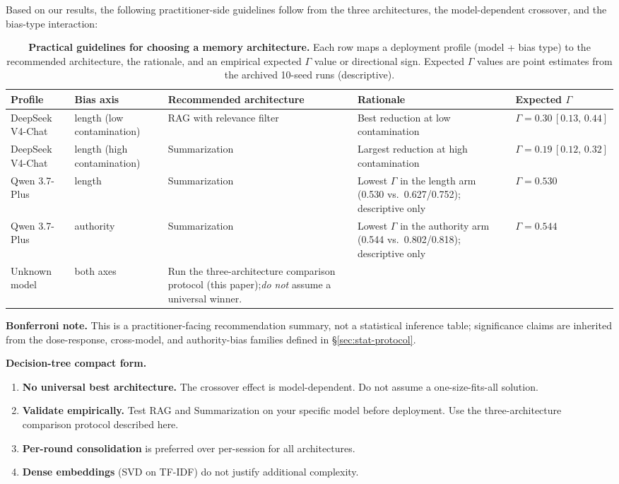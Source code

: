 \documentclass[11pt]{article}
\begin{document}
Based on our results, the following practitioner-side guidelines follow from the three architectures, the model-dependent crossover, and the bias-type interaction:

\begin{table}[t]
\centering
\caption{\textbf{Practical guidelines for choosing a memory architecture.} Each row maps a deployment profile (model + bias type) to the recommended architecture, the rationale, and an empirical expected $\Gamma$ value or directional sign. Expected $\Gamma$ values are point estimates from the archived 10-seed runs (descriptive).}
\label{tab:guidelines}
\small
\begin{tabular}{@{}p{2.4cm}p{2.2cm}p{3.1cm}p{3.3cm}p{2.4cm}@{}}
\toprule
\textbf{Profile} & \textbf{Bias axis} & \textbf{Recommended architecture} & \textbf{Rationale} & \textbf{Expected $\Gamma$} \\
\midrule
DeepSeek V4-Chat & length (low contamination)  & RAG with relevance filter & Best reduction at low contamination       & $\Gamma = 0.30\,[0.13,\,0.44]$ \\
DeepSeek V4-Chat & length (high contamination) & Summarization              & Largest reduction at high contamination   & $\Gamma = 0.19\,[0.12,\,0.32]$ \\
Qwen 3.7-Plus     & length                       & Summarization                & Lowest $\Gamma$ in the length arm (0.530 vs.\ 0.627/0.752); descriptive only & $\Gamma = 0.530$ \\
Qwen 3.7-Plus     & authority                    & Summarization                & Lowest $\Gamma$ in the authority arm (0.544 vs.\ 0.802/0.818); descriptive only & $\Gamma = 0.544$ \\
Unknown model     & both axes                    & Run the three-architecture comparison protocol (this paper);\emph{do not} assume a universal winner. & & \\
\bottomrule
\end{tabular}
\par\smallskip
{\small\textbf{Bonferroni note.} This is a practitioner-facing recommendation summary, not a statistical inference table; significance claims are inherited from the dose-response, cross-model, and authority-bias families defined in \S\ref{sec:stat-protocol}.}
\end{table}

\noindent\textbf{Decision-tree compact form.}
\begin{enumerate}[nosep]
    \item \textbf{No universal best architecture.} The crossover effect is model-dependent. Do not assume a one-size-fits-all solution.
    \item \textbf{Validate empirically.} Test RAG and Summarization on your specific model before deployment. Use the three-architecture comparison protocol described here.
    \item \textbf{Per-round consolidation} is preferred over per-session for all architectures.
    \item \textbf{Dense embeddings} (SVD on TF-IDF) do not justify additional complexity.
\end{enumerate}
\end{document}
